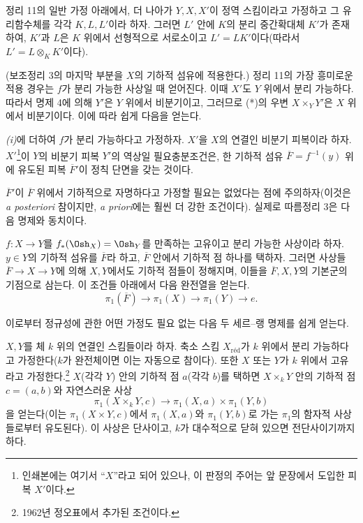 정리 11의 일반 가정 아래에서, 더 나아가
$Y,X,X'$이 정역 스킴이라고 가정하고 그 유리함수체를 각각 $K,L,L'$이라
하자. 그러면 $L'$ 안에 $K$의 분리 중간확대체 $K'$가 존재하여, $K'$과
$L$은 $K$ 위에서 선형적으로 서로소이고 $L'=LK'$이다(따라서
$L'=L\otimes_K K'$이다).

(보조정리 3의 마지막 부분을 $X$의 기하적 섬유에 적용한다.) 정리 11의
가장 흥미로운 적용 경우는 $f$가 분리 가능한 사상일 때 얻어진다. 이때
$X'$도 $Y$ 위에서 분리 가능하다. 따라서 명제 4에 의해 $Y'$은 $Y$ 위에서
비분기이고, 그러므로 (*)의 우변 $X\times_Y Y'$은 $X$ 위에서 비분기이다.
이에 따라 쉽게 다음을 얻는다.

 \textit{(i)}에 더하여 $f$가 분리 가능하다고 가정하자.
$X'$을 $X$의 연결인 비분기 피복이라 하자. $X'$\footnote{인쇄본에는
여기서 ``$X$''라고 되어 있으나, 이 판정의 주어는 앞 문장에서 도입한
피복 $X'$이다.}이 $Y$의 비분기 피복 $Y'$의 역상일 필요충분조건은, 한
기하적 섬유 $\overline F=f^{-1}(y)$ 위에 유도된 피복 $\overline F'$이
정칙 단면을 갖는 것이다.

$\overline F'$이 $\overline F$ 위에서 기하적으로 자명하다고 가정할 필요는
없었다는 점에 주의하자(이것은 \textit{a posteriori} 참이지만,
\textit{a priori}에는 훨씬 더 강한 조건이다). 실제로 따름정리 3은 다음
명제와 동치이다.

 $f:X\longrightarrow Y$를
$f_*(\Osh_X)=\Osh_Y$를 만족하는 고유이고 분리 가능한 사상이라 하자.
$y\in Y$의 기하적 섬유를 $\overline F$라 하고, $\overline F$ 안에서
기하적 점 하나를 택하자. 그러면 사상들
$\overline F\longrightarrow X\longrightarrow Y$에 의해 $X,Y$에서도
기하적 점들이 정해지며, 이들을 $\overline F,X,Y$의 기본군의 기점으로
삼는다. 이 조건들 아래에서 다음 완전열을 얻는다.
\[
  \boxed{
    \pi_1(\overline F)\longrightarrow\pi_1(X)
    \longrightarrow\pi_1(Y)\longrightarrow e
  }.
\]

이로부터 정규성에 관한 어떤 가정도 필요 없는 다음 두 세르--랭 명제를
쉽게 얻는다.

 $X,Y$를 체 $k$ 위의 연결인 스킴들이라 하자. 축소
스킴 $X_{\mathrm{réd}}$가 $k$ 위에서 분리 가능하다고 가정한다($k$가
완전체이면 이는 자동으로 참이다). 또한 $X$ 또는 $Y$가 $k$ 위에서
고유라고 가정한다.\footnote{1962년 정오표에서 추가된 조건이다.} $X$(각각
$Y$) 안의 기하적 점 $a$(각각 $b$)를 택하면 $X\times_kY$ 안의 기하적 점
$c=(a,b)$와 자연스러운 사상
\[
  \pi_1(X\times_kY,c)\longrightarrow
  \pi_1(X,a)\times\pi_1(Y,b)
\]
을 얻는다(이는 $\pi_1(X\times Y,c)$에서 $\pi_1(X,a)$와
$\pi_1(Y,b)$로 가는 $\pi_1$의 함자적 사상들로부터 유도된다). 이 사상은
단사이고, $k$가 대수적으로 닫혀 있으면 전단사이기까지 하다.

